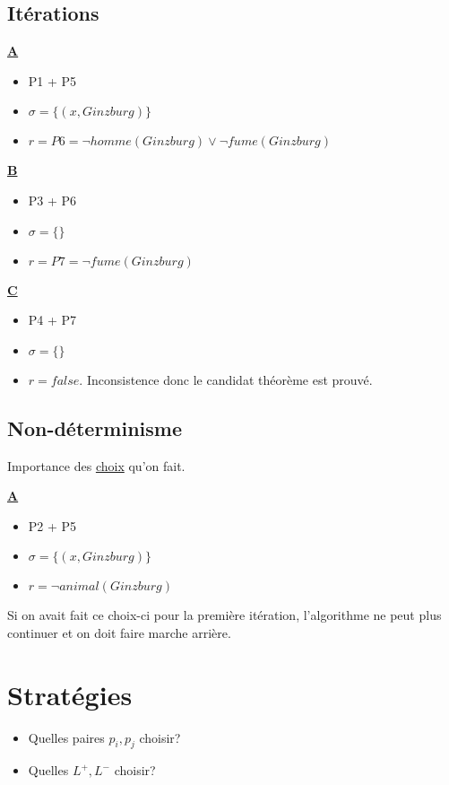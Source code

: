 \subsection{Itérations}

\textbf{\underline{A}}
\begin{itemize}
  \item P1 + P5
  \item $\sigma = \big\{ (x, Ginzburg) \big\}$
  \item $r = P6 = \neg homme(Ginzburg) \vee \neg fume(Ginzburg)$
\end{itemize}

\textbf{\underline{B}}
\begin{itemize}
  \item P3 + P6
  \item $\sigma = \big\{ \big\}$
  \item $r = P7 = \neg fume(Ginzburg)$
\end{itemize}

\textbf{\underline{C}}
\begin{itemize}
  \item P4 + P7
  \item $\sigma = \big\{ \big\}$
  \item $r = false.$ Inconsistence donc le candidat théorème est prouvé.
\end{itemize}

\subsection{Non-déterminisme}

Importance des \underline{choix} qu'on fait.

\textbf{\underline{A}}
\begin{itemize}
  \item P2 + P5
  \item $\sigma = \big\{ (x, Ginzburg) \big\}$
  \item $r = \neg animal(Ginzburg)$
\end{itemize}

Si on avait fait ce choix-ci pour la première itération, l'algorithme ne peut plus continuer et on doit faire marche arrière.

\section{Stratégies}

\begin{itemize}
  \item Quelles paires $p_i, p_j$ choisir?
  \item Quelles $L^{+}, L^{-}$ choisir?
\end{itemize}

